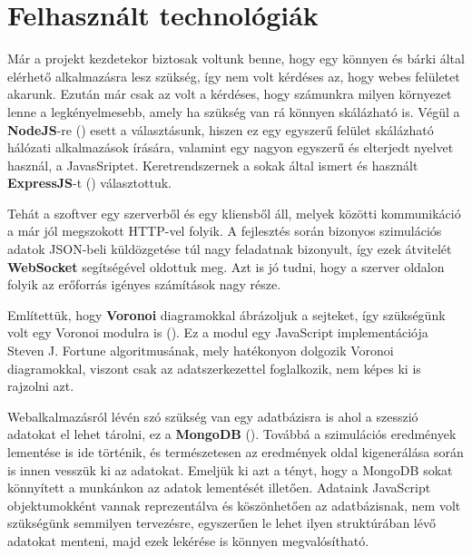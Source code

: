 \section{Felhasznált technológiák}

Már a projekt kezdetekor biztosak voltunk benne, hogy egy könnyen és bárki által elérhető alkalmazásra lesz szükség, így nem volt kérdéses az, hogy webes felületet akarunk. Ezután már csak az volt a kérdéses, hogy számunkra milyen környezet lenne a legkényelmesebb, amely ha szükség van rá könnyen skálázható is. Végül a \textbf{NodeJS}-re (\cite{soft:node}) esett a választásunk, hiszen ez egy egyszerű felület skálázható hálózati alkalmazások írására, valamint egy nagyon egyszerű és elterjedt nyelvet használ, a JavasSriptet. Keretrendszernek a sokak által ismert és használt \textbf{ExpressJS}-t (\cite{soft:express}) választottuk.

Tehát a szoftver egy szerverből és egy kliensből áll, melyek közötti kommunikáció a már jól megszokott HTTP-vel folyik. A fejlesztés során bizonyos szimulációs adatok JSON-beli küldözgetése túl nagy feladatnak bizonyult, így ezek átvitelét \textbf{WebSocket} segítségével oldottuk meg. Azt is jó tudni, hogy a szerver oldalon folyik az erőforrás igényes számítások nagy része.

Említettük, hogy \textbf{Voronoi} diagramokkal ábrázoljuk a sejteket, így szükségünk volt egy Voronoi modulra is (\cite{soft:voronoiModule}). Ez a modul egy JavaScript implementációja Steven J. Fortune algoritmusának, mely hatékonyon dolgozik Voronoi diagramokkal, viszont csak az adatszerkezettel foglalkozik, nem képes ki is rajzolni azt.

Webalkalmazásról lévén szó szükség van egy adatbázisra is ahol a szesszió adatokat el lehet tárolni, ez a \textbf{MongoDB} (\cite{soft:mongodb}). Továbbá a szimulációs eredmények lementése is ide történik, és természetesen az eredmények oldal kigenerálása során is innen vesszük ki az adatokat. Emeljük ki azt a tényt, hogy a MongoDB sokat könnyített a munkánkon az adatok lementését illetően. Adataink JavaScript objektumokként vannak reprezentálva és köszönhetően az adatbázisnak, nem volt szükségünk semmilyen tervezésre, egyszerűen le lehet ilyen struktúrában lévő adatokat menteni, majd ezek lekérése is könnyen megvalósítható.

